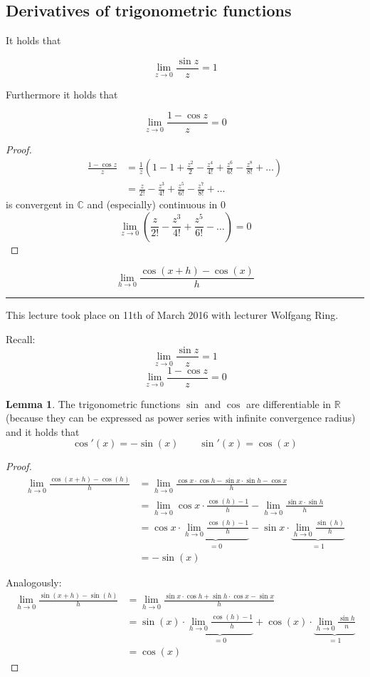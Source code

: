 \documentclass[a4paper,landscape,twocolumn]{article}
\theoremstyle{definition}
\newtheorem{lemma}{Lemma}
\newcommand\meta[3]{\hrule{} This #1 took place on #2 with lecturer #3.\par}
\begin{document}
\subsection{Derivatives of trigonometric functions}
%
It holds that
\begin{mdframed}
  \[ \lim_{z \to 0} \frac{\sin{z}}{z} = 1 \]
\end{mdframed}
Furthermore it holds that
\begin{mdframed}
  \[ \lim_{z \to 0} \frac{1 - \cos{z}}{z} = 0 \]
\end{mdframed}

\begin{proof}
  \begin{align*}
    \frac{1 - \cos{z}}{z}
      &= \frac1z \left(1 - 1 + \frac{z^2}{2} - \frac{z^4}{4!} + \frac{z^6}{6!} - \frac{z^8}{8!} + \ldots\right) \\
      &= \frac{z}{2!} - \frac{z^3}{4!} + \frac{z^5}{6!} - \frac{z^7}{8!} + \ldots
  \end{align*}
  is convergent in $\mathbb C$ and (especially) continuous in $0$
  \[ \lim_{z \to 0} \left(\frac{z}{2!} - \frac{z^3}{4!} + \frac{z^5}{6!} - \ldots\right) = 0 \]
\end{proof}

\[
  \lim_{h\to0} \frac{\cos(x + h) - \cos(x)}{h}
\]

\meta{lecture}{11th of March 2016}{Wolfgang Ring}

Recall:
\[ \lim_{z\to0} \frac{\sin{z}}{z} = 1 \]
\[ \lim_{z\to0} \frac{1-\cos{z}}{z} = 0 \]

\begin{lemma}
  The trigonometric functions $\sin$ and $\cos$ are differentiable in $\mathbb R$
  (because they can be expressed as power series with infinite convergence radius)
  and it holds that
  \[ \cos'(x) = -\sin(x)  \qquad  \sin'(x) = \cos(x) \]
\end{lemma}
\begin{proof}
  \begin{align*}
    \lim_{h\to0} \frac{\cos(x + h) - \cos(h)}{h}
      &= \lim_{h\to0} \frac{\cos{x} \cdot \cos{h} - \sin{x} \cdot \sin{h} - \cos{x}}{h} \\
      &= \lim_{h\to0} \cos{x} \cdot \frac{\cos(h) - 1}{h} - \lim_{h\to0} \frac{\sin{x} \cdot \sin{h}}{h} \\
      &= \cos{x} \cdot \underbrace{\lim_{h\to0} \frac{\cos(h) - 1}{h}}_{=0} - \sin{x} \cdot \underbrace{\lim_{h\to0} \frac{\sin(h)}{h}}_{=1} \\
      &= -\sin(x)
  \end{align*}

  Analogously:
  \begin{align*}
    \lim_{h\to0} \frac{\sin(x + h) - \sin(h)}{h}
      &= \lim_{h\to0} \frac{\sin{x} \cdot \cos{h} + \sin{h} \cdot \cos{x} - \sin{x}}{h} \\
      &= \sin(x) \cdot \underbrace{\lim_{h\to0} \frac{\cos(h) - 1}{h}}_{=0} + \cos(x) \cdot \underbrace{\lim_{h\to0} \frac{\sin{h}}{n}}_{=1} \\
      &= \cos(x)
  \end{align*}
\end{proof}
\end{document}
